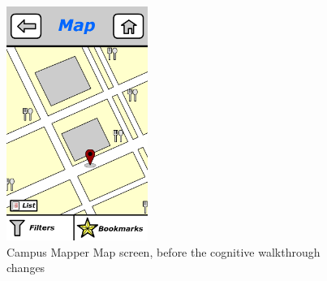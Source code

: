 \documentclass{report}
\begin{document}
    \begin{figure}
        \centering
            \includegraphics[height=3in]{img/map_resturants.png} 
        \caption{Campus Mapper Map screen, before the cognitive walkthrough changes}
        \label{fig:digital-map}
    \end{figure}
\end{document}
